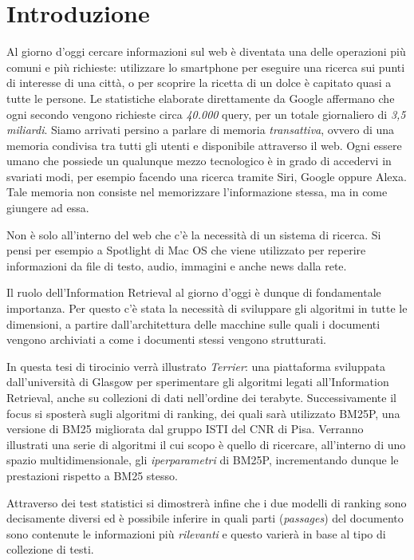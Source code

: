 \chapter{Introduzione}
Al giorno d'oggi cercare informazioni sul web è diventata una delle operazioni più comuni e più richieste:
utilizzare lo smartphone per eseguire una ricerca sui punti di interesse di una città, o per scoprire la ricetta di un dolce è capitato quasi a tutte le persone.
Le statistiche elaborate direttamente da Google affermano che ogni secondo vengono richieste circa \textit{40.000} query, per un totale
giornaliero di \textit{3,5 miliardi}.
Siamo arrivati persino a parlare di memoria \textit{transattiva}, ovvero di una memoria condivisa tra tutti gli utenti e disponibile attraverso il web.
Ogni essere umano che possiede un qualunque mezzo tecnologico è in grado di accedervi in svariati modi, per esempio facendo una ricerca tramite Siri, Google oppure Alexa.
Tale memoria non consiste nel memorizzare l'informazione stessa, ma in come giungere ad essa.

Non è solo all'interno del web che c'è la necessità di un sistema di ricerca. Si pensi per esempio a Spotlight di Mac OS che
viene utilizzato per reperire informazioni da file di testo, audio, immagini e anche news dalla rete.

Il ruolo dell'Information Retrieval al giorno d'oggi è dunque di fondamentale importanza.
Per questo c'è stata la necessità di sviluppare gli algoritmi in tutte le dimensioni, a partire dall'architettura delle macchine sulle quali i documenti vengono archiviati a come i documenti stessi vengono strutturati.

In questa tesi di tirocinio verrà illustrato \textit{Terrier}: una piattaforma sviluppata dall'università di Glasgow
per sperimentare gli algoritmi legati all'Information Retrieval, anche su collezioni di dati nell'ordine dei terabyte.  Successivamente il focus si sposterà
sugli algoritmi di ranking, dei quali sarà utilizzato BM25P, una versione di BM25 migliorata dal gruppo ISTI del CNR di Pisa.
Verranno illustrati una serie di algoritmi il cui scopo è quello di ricercare, all'interno di uno spazio multidimensionale,
gli \textit{iperparametri} di BM25P, incrementando dunque le prestazioni rispetto a BM25 stesso.

Attraverso dei test statistici si dimostrerà infine che i due modelli di ranking sono decisamente diversi ed è possibile
inferire in quali parti (\textit{passages}) del documento sono contenute le informazioni più \textit{rilevanti}
e questo varierà in base al tipo di collezione di testi.

